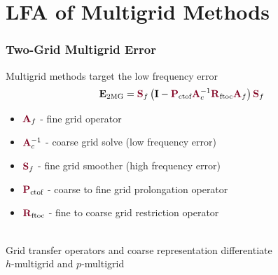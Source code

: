 \documentclass{beamer}
\begin{document}
\section{LFA of Multigrid Methods}

\begin{frame}
\begin{center}
\frametitle{Two-Grid Multigrid Error}

Multigrid methods target the low frequency error\\

\begin{equation}
\mathbf{E}_{\text{2MG}} = {\color{burgundy}\mathbf{S}}_f \left( \mathbf{I} - {\color{burgundy}\mathbf{P}}_{\text{ctof}} {\color{burgundy}\mathbf{A}}_c^{-1} {\color{burgundy}\mathbf{R}}_{\text{ftoc}} {\color{burgundy}\mathbf{A}}_f \right) {\color{burgundy}\mathbf{S}}_f
\end{equation}

\begin{itemize}

\item ${\color{burgundy}\mathbf{A}}_f$ - fine grid operator

\item ${\color{burgundy}\mathbf{A}}_c^{-1}$ - coarse grid solve (low frequency error)

\item ${\color{burgundy}\mathbf{S}}_f$ - fine grid smoother (high frequency error)

\item ${\color{burgundy}\mathbf{P}}_{\text{ctof}}$ - coarse to fine grid prolongation operator

\item ${\color{burgundy}\mathbf{R}}_{\text{ftoc}}$ - fine to coarse grid restriction operator

\end{itemize}

~\\

Grid transfer operators and coarse representation differentiate\\$h$-multigrid and $p$-multigrid

\end{center}
\end{frame}

\end{document}
